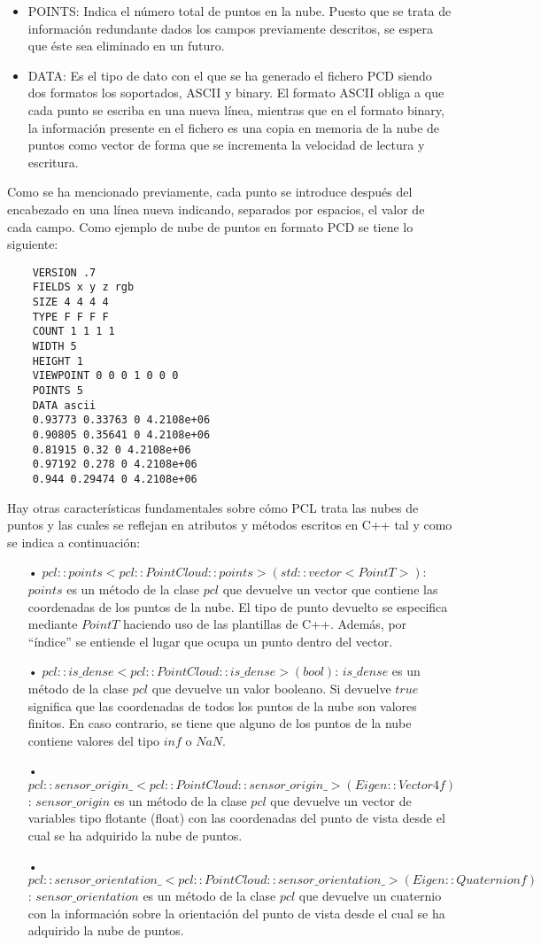 \begin{itemize}
\item POINTS:
Indica el número total de puntos en la nube. Puesto que se trata de información redundante dados los campos previamente descritos, se espera que éste sea eliminado en un futuro.

\item DATA:
Es el tipo de dato con el que se ha generado el fichero PCD siendo dos formatos los soportados, ASCII y binary. El formato ASCII obliga a que cada punto se escriba en una nueva línea, mientras que en el formato binary, la información presente en el fichero es una copia en memoria de la nube de puntos como vector de forma que se incrementa la velocidad de lectura y escritura.
\end{itemize}

Como se ha mencionado previamente, cada punto se introduce después del encabezado en una línea nueva indicando, separados por espacios, el valor de cada campo. Como ejemplo de nube de puntos en formato PCD se tiene lo siguiente:

\begin{lstlisting}
	VERSION .7
	FIELDS x y z rgb
	SIZE 4 4 4 4
	TYPE F F F F
	COUNT 1 1 1 1
	WIDTH 5
	HEIGHT 1
	VIEWPOINT 0 0 0 1 0 0 0
	POINTS 5
	DATA ascii
	0.93773 0.33763 0 4.2108e+06
	0.90805 0.35641 0 4.2108e+06
	0.81915 0.32 0 4.2108e+06
	0.97192 0.278 0 4.2108e+06
	0.944 0.29474 0 4.2108e+06
\end{lstlisting}

Hay otras características fundamentales\cite{PCD_extras} sobre cómo PCL trata las nubes de puntos y las cuales se reflejan en atributos y métodos escritos en C++ tal y como se indica a continuación:

\begin{itemize}
\item[•]$pcl::points<pcl::PointCloud::points> (std::vector<PointT>)$: $points$ es un método de la clase $pcl$ que devuelve un vector que contiene las coordenadas de los puntos de la nube. El tipo de punto devuelto se especifica mediante $PointT$ haciendo uso de las plantillas de C++. Además, por ``índice'' se entiende el lugar que ocupa un punto dentro del vector.
\item[•]$pcl::is\_dense<pcl::PointCloud::is\_dense> (bool)$: $is\_dense$ es un método de la clase $pcl$ que devuelve un valor booleano. Si devuelve $true$ significa que las coordenadas de todos los puntos de la nube son valores finitos. En caso contrario, se tiene que alguno de los puntos de la nube contiene valores del tipo $inf$ o $NaN$.
\item[•]$pcl::sensor\_origin\_<pcl::PointCloud::sensor\_origin\_> (Eigen::Vector4f)$: $sensor\_origin$ es un método de la clase $pcl$ que devuelve un vector de variables tipo flotante (float) con las coordenadas del punto de vista desde el cual se ha adquirido la nube de puntos.

\item[•]$pcl::sensor\_orientation\_<pcl::PointCloud::sensor\_orientation\_> (Eigen::Quaternionf)$: $sensor\_orientation$ es un método de la clase $pcl$ que devuelve un cuaternio con la información sobre la orientación del punto de vista desde el cual se ha adquirido la nube de puntos.
\end{itemize}

